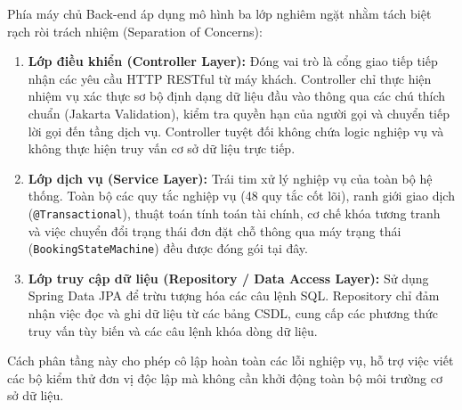 Phía máy chủ Back-end áp dụng mô hình ba lớp nghiêm ngặt nhằm tách biệt rạch ròi trách nhiệm (Separation of Concerns):
\begin{enumerate}
    \item \textbf{Lớp điều khiển (Controller Layer):} Đóng vai trò là cổng giao tiếp tiếp nhận các yêu cầu HTTP RESTful từ máy khách. Controller chỉ thực hiện nhiệm vụ xác thực sơ bộ định dạng dữ liệu đầu vào thông qua các chú thích chuẩn (Jakarta Validation), kiểm tra quyền hạn của người gọi và chuyển tiếp lời gọi đến tầng dịch vụ. Controller tuyệt đối không chứa logic nghiệp vụ và không thực hiện truy vấn cơ sở dữ liệu trực tiếp.
    \item \textbf{Lớp dịch vụ (Service Layer):} Trái tim xử lý nghiệp vụ của toàn bộ hệ thống. Toàn bộ các quy tắc nghiệp vụ (48 quy tắc cốt lõi), ranh giới giao dịch (\texttt{@Transactional}), thuật toán tính toán tài chính, cơ chế khóa tương tranh và việc chuyển đổi trạng thái đơn đặt chỗ thông qua máy trạng thái (\texttt{BookingStateMachine}) đều được đóng gói tại đây.
    \item \textbf{Lớp truy cập dữ liệu (Repository / Data Access Layer):} Sử dụng Spring Data JPA để trừu tượng hóa các câu lệnh SQL. Repository chỉ đảm nhận việc đọc và ghi dữ liệu từ các bảng CSDL, cung cấp các phương thức truy vấn tùy biến và các câu lệnh khóa dòng dữ liệu.
\end{enumerate}
Cách phân tầng này cho phép cô lập hoàn toàn các lỗi nghiệp vụ, hỗ trợ việc viết các bộ kiểm thử đơn vị độc lập mà không cần khởi động toàn bộ môi trường cơ sở dữ liệu.

